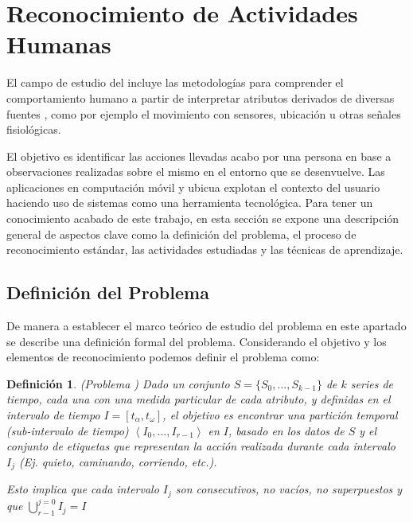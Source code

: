 \section{Reconocimiento de Actividades Humanas}

El campo de estudio del  incluye las metodologías para
comprender el comportamiento humano a partir de interpretar atributos
derivados de diversas fuentes \cite{Bao2004,Poppe2007}, como por
ejemplo el movimiento con sensores, ubicación u otras señales fisiológicas. 

El objetivo es identificar las acciones llevadas acabo por una persona
en base a observaciones realizadas sobre el mismo en el entorno que
se desenvuelve. Las aplicaciones en computación móvil y ubicua explotan
el contexto del usuario haciendo uso de sistemas  como
una herramienta tecnológica. Para tener un conocimiento acabado de
este trabajo, en esta sección se expone una descripción general de
aspectos clave como la definición del problema, el proceso de reconocimiento
estándar, las actividades estudiadas y las técnicas de aprendizaje.

\subsection{Definición del Problema}

\label{sec261:definicion-har}De manera a establecer el marco teórico
de estudio del problema  en este apartado se describe una
definición formal del problema. Considerando el objetivo y los elementos
de reconocimiento podemos definir el problema como\cite{LaraLabrador2013}:

\newtheorem{defi}{Definición}

\begin{defi}(Problema ) Dado un conjunto $S=\{S_{0},...,S_{k-1}\}$
de $k$ series de tiempo, cada una con una medida particular de cada
atributo, y definidas en el intervalo de tiempo $I=\left[t_{\alpha},t_{\omega}\right]$,
el objetivo es encontrar una partición temporal (sub-intervalo de
tiempo) $\left\langle I_{0},...,I_{r-1}\right\rangle $ en $I$, basado
en los datos de $S$ y el conjunto de etiquetas que representan la
acción realizada durante cada intervalo $I_{j}$ (Ej. quieto, caminando,
corriendo, etc.). 

Esto implica que cada intervalo $I_{j}$ son consecutivos, no vacíos,
no superpuestos y que ${\displaystyle \bigcup_{r-1}^{j=0}{I_{j}=I}}$
\end{defi}

